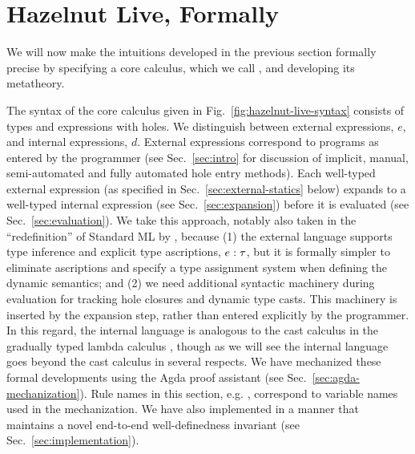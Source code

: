 \newcommand{\calculusSec}{Hazelnut Live, Formally}
\section{\protect\calculusSec}
\label{sec:calculus}





We will now make the intuitions developed in the previous section formally precise by specifying a core calculus, which we call \HazelnutLive, and developing its metatheory.

 The syntax of the core calculus given in Fig.~\ref{fig:hazelnut-live-syntax} consists of types and expressions with holes.
We distinguish between {external} expressions, $e$, and {internal} expressions, $d$.
External expressions correspond to programs as entered by the programmer
(see Sec.~\ref{sec:intro} for discussion of implicit, manual, semi-automated and fully automated hole entry methods).
Each well-typed external expression (as specified in Sec.~\ref{sec:external-statics} below) expands to a well-typed internal expression (see Sec.~\ref{sec:expansion}) before it is evaluated (see Sec.~\ref{sec:evaluation}).
We take this approach, notably also taken in the ``redefinition'' of Standard ML by \citet{Harper00atype-theoretic}, because (1) the external language supports type inference and explicit type ascriptions, $e : \tau$, but it is formally simpler to eliminate ascriptions and specify a type assignment system when defining the dynamic semantics; and
(2) we need additional syntactic machinery during evaluation for tracking hole closures and dynamic type casts.
This machinery is inserted by the expansion step, rather than entered explicitly by the programmer.
In this regard, the internal language is analogous to the cast calculus in the gradually typed lambda calculus \cite{DBLP:conf/snapl/SiekVCB15,Siek06a}, though as we will see the \HazelnutLive internal language goes beyond the cast calculus in several respects. We have mechanized these formal developments using the Agda proof assistant \cite{norell:thesis,norell2009dependently}
(see Sec.~\ref{sec:agda-mechanization}). Rule names in this section, e.g. , correspond to variable names used in the mechanization. We have also implemented \HazelnutLive in a manner that maintains a novel end-to-end well-definedness invariant (see Sec.~\ref{sec:implementation}).

